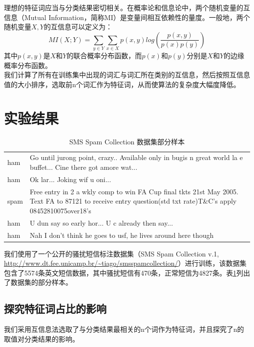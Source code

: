 \documentclass[a4paper, twocolumn, 12pt]{article}
\begin{document}
理想的特征词应当与分类结果密切相关。在概率论和信息论中，两个随机变量的互信息（Mutual Information，简称MI）是变量间相互依赖性的量度。一般地，两个随机变量$X, Y$的互信息可以定义为：
\[MI(X; Y)=\sum_{y\in Y}\sum_{x\in X}p(x, y)log(\frac{p(x, y)}{p(x)p(y)})\]
其中$p(x,y)$是$X$和$Y$的联合概率分布函数，而$p(x)$和$p(y)$分别是$X$和$Y$的边缘概率分布函数。\\

我们计算了所有在训练集中出现的词汇与词汇所在类别的互信息，然后按照互信息值的大小排序，选取前n个词汇作为特征词，从而使算法的复杂度大幅度降低。

\section{实验结果}

\begin{table}[hbtp]
    \centering
    \begin{tabular}{lp{14cm}}
        \hline
        ham&	Go until jurong point, crazy.. Available only in bugis n great world la e buffet... Cine there got amore wat...\\
        ham&	Ok lar... Joking wif u oni...\\
        spam&	Free entry in 2 a wkly comp to win FA Cup final tkts 21st May 2005. Text FA to 87121 to receive entry question(std txt rate)T\&C's apply 08452810075over18's\\
        ham&	U dun say so early hor... U c already then say...\\
        ham&	Nah I don't think he goes to usf, he lives around here though\\
        \hline
    \end{tabular}
    \caption{SMS Spam Collection 数据集部分样本}
    \label{table_1}
    \end{table}

我们使用了一个公开的骚扰短信标注数据集（SMS Spam Collection v.1, \url{http://www.dt.fee.unicamp.br/~tiago/smsspamcollection/}）进行训练，该数据集包含了5574条英文短信数据，其中骚扰短信有470条，正常短信为4827条。表\ref{table_1}列出了数据集的部分样本。\\

\subsection{探究特征词占比的影响}
我们采用互信息法选取了与分类结果最相关的n个词作为特征词，并且探究了n的取值对分类结果的影响。\\
\end{document}
